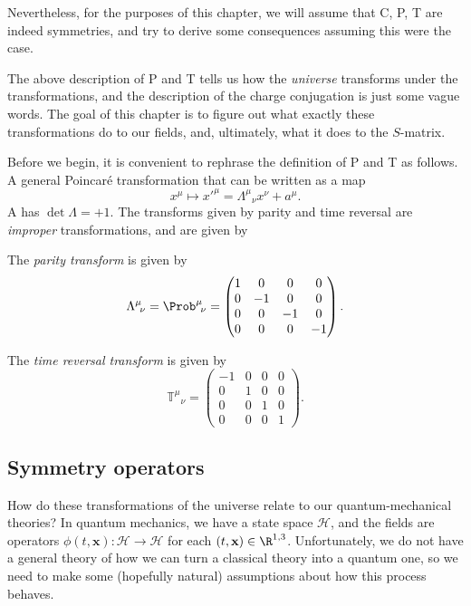 \documentclass[a4paper]{article}
\begin{document}
Nevertheless, for the purposes of this chapter, we will assume that C, P, T are indeed symmetries, and try to derive some consequences assuming this were the case.

The above description of P and T tells us how the \emph{universe} transforms under the transformations, and the description of the charge conjugation is just some vague words. The goal of this chapter is to figure out what exactly these transformations do to our fields, and, ultimately, what it does to the $S$-matrix.

Before we begin, it is convenient to rephrase the definition of P and T as follows. A general Poincar\'e transformation that can be written as a map
\[
  x^\mu \mapsto x'^\mu = \Lambda^\mu\!_\nu x^\nu + a^\mu.
\]
A  has $\det \Lambda = +1$. The transforms given by parity and time reversal are \emph{improper} transformations, and are given by
\begin{defi}
  The \emph{parity transform} is given by
  \[
    \Lambda^\mu\!_\nu = \Prob^\mu\!_\nu =
    \begin{pmatrix}
      1 & 0 & 0 & 0\\
      0 & -1 & 0 & 0\\
      0 & 0 & -1 & 0\\
      0 & 0 & 0 & -1
    \end{pmatrix}.
  \]
\end{defi}


\begin{defi}
  The \emph{time reversal transform} is given by
  \[
    \mathbb{T}^\mu\!_\nu =
    \begin{pmatrix}
      -1 & 0 & 0 & 0\\
      0 & 1 & 0 & 0\\
      0 & 0 & 1 & 0\\
      0 & 0 & 0 & 1
    \end{pmatrix}.
  \]
\end{defi}

\subsection{Symmetry operators}
How do these transformations of the universe relate to our quantum-mechanical theories? In quantum mechanics, we have a state space $\mathcal{H}$, and the fields are operators $\phi(t, \mathbf{x}): \mathcal{H} \to \mathcal{H}$ for each $(t, \mathbf{x}) \in \R^{1, 3}$. Unfortunately, we do not have a general theory of how we can turn a classical theory into a quantum one, so we need to make some (hopefully natural) assumptions about how this process behaves.
\end{document}
